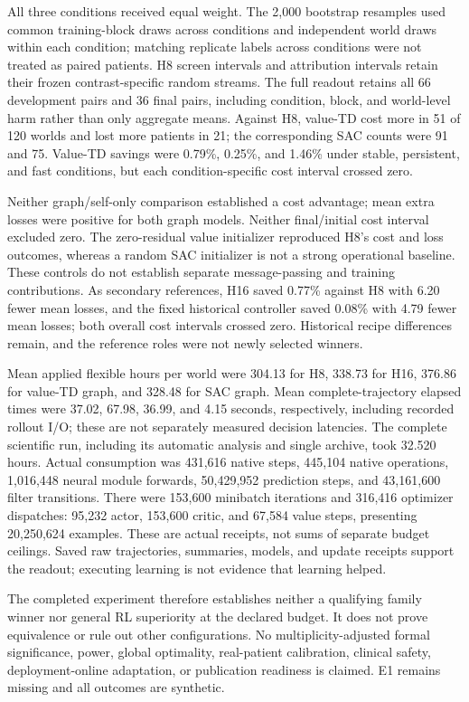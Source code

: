 \documentclass[preprint,review,12pt]{elsarticle}
\begin{document}
All three conditions received equal weight. The 2,000 bootstrap resamples
used common training-block draws across conditions and independent world
draws within each condition; matching replicate labels across conditions
were not treated as paired patients. H8 screen intervals and attribution
intervals retain their frozen contrast-specific random streams. The full
readout retains all 66 development pairs and 36 final pairs, including
condition, block, and world-level harm rather than only aggregate means.
Against H8, value-TD cost more in 51 of 120 worlds and lost more patients
in 21; the corresponding SAC counts were 91 and 75. Value-TD savings
were 0.79\%, 0.25\%, and 1.46\% under stable, persistent, and fast conditions,
but each condition-specific cost interval crossed zero.

Neither graph/self-only comparison established a cost advantage; mean extra
losses were positive for both graph models. Neither final/initial cost
interval excluded zero. The zero-residual value initializer reproduced H8's
cost and loss outcomes, whereas a random SAC initializer is not a strong
operational baseline. These controls do not establish separate message-passing
and training contributions. As secondary references, H16 saved 0.77\%
against H8 with 6.20 fewer mean losses, and the fixed historical controller
saved 0.08\% with 4.79 fewer mean losses; both overall cost intervals crossed
zero. Historical recipe differences remain, and the reference roles were
not newly selected winners.

Mean applied flexible hours per world were 304.13 for H8, 338.73 for H16,
376.86 for value-TD graph, and 328.48 for SAC graph. Mean complete-trajectory
elapsed times were 37.02, 67.98, 36.99, and 4.15 seconds, respectively,
including recorded rollout I/O; these are not separately measured decision
latencies. The complete scientific run, including its automatic analysis and
single archive, took 32.520 hours. Actual consumption was 431,616 native
steps, 445,104 native operations, 1,016,448 neural module forwards,
50,429,952 prediction steps, and 43,161,600 filter transitions.
There were 153,600 minibatch iterations and 316,416 optimizer dispatches:
95,232 actor, 153,600 critic, and 67,584 value steps, presenting
20,250,624 examples. These are actual receipts, not sums of separate budget
ceilings. Saved raw trajectories, summaries, models, and update receipts
support the readout; executing learning is not evidence that learning helped.

The completed experiment therefore establishes neither a qualifying family
winner nor general RL superiority at the declared budget. It does not prove
equivalence or rule out other configurations. No multiplicity-adjusted formal
significance, power, global optimality, real-patient calibration, clinical
safety, deployment-online adaptation, or publication readiness is claimed.
E1 remains missing and all outcomes are synthetic.
\end{document}
